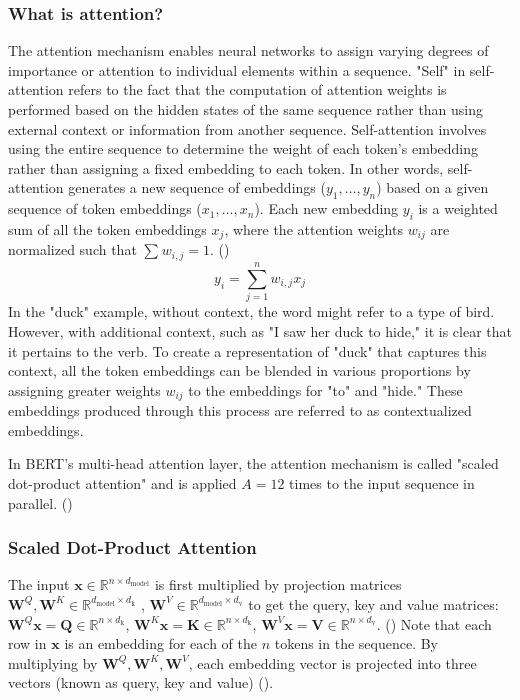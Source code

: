 \subsubsection{What is attention?}
The attention mechanism enables neural networks to assign varying degrees of importance or attention to individual elements within a sequence. "Self" in self-attention refers to the fact that the computation of attention weights is performed based on the hidden states of the same sequence rather than using external context or information from another sequence. 
Self-attention involves using the entire sequence to determine the weight of each token's embedding rather than assigning a fixed embedding to each token. In other words, self-attention generates a new sequence of embeddings ($y_1, \dots, y_n$) based on a given sequence of token embeddings ($x_1, \dots, x_n$). Each new embedding $y_i$ is a weighted sum of all the token embeddings $x_j$, where the attention weights $w_{ij}$ are normalized such that $\sum_{}^{} w_{i,j} = 1$. (\cite{tunstall_natural_2022})
$$y_i = \sum_{j=1}^{n} w_{i,j} x_j$$
In the "duck" example, without context, the word might refer to a type of bird. However, with additional context, such as "I saw her duck to hide," it is clear that it pertains to the verb. To create a representation of "duck" that captures this context, all the token embeddings can be blended in various proportions by assigning greater weights $w_{ij}$ to the embeddings for "to" and "hide." These embeddings produced through this process are referred to as contextualized embeddings.

In BERT's multi-head attention layer, the attention mechanism is called "scaled dot-product attention" and is applied $A = 12$ times to the input sequence in parallel. (\cite{tunstall_natural_2022})


\subsubsection{Scaled Dot-Product Attention}

The input
$\mathbf{x} \in \mathbb{R}^
{n \times d_{\text{model}}}$
is first multiplied by projection matrices
$\mathbf{W}^Q, \mathbf{W}^K \in \mathbb{R}^
{d_{\text{model}} \times d_{\text{k}}}$
,
$\mathbf{W}^V \in \mathbb{R}^
{d_{\text{model}} \times d_{\text{v}}}$
to get the query, key and value matrices:
$ \mathbf{W}^Q \mathbf{x} = \mathbf{Q} \in \mathbb{R}^
{n \times d_{\text{k}}}$, 
$ \mathbf{W}^K  \mathbf{x} = \mathbf{K} \in \mathbb{R}^
{n \times d_{\text{k}}}$, 
$ \mathbf{W}^V \mathbf{x} = \mathbf{V} \in \mathbb{R}^
{n \times d_{\text{v}}}$. (\cite{thickstun_transformer_2020})
Note that each row in $\mathbf{x}$ is an embedding for each of the $n$ tokens in the sequence. By multiplying by $\mathbf{W}^Q, \mathbf{W}^K, \mathbf{W}^V$, each embedding vector is projected into three vectors (known as query, key and value) (\cite{tunstall_natural_2022}).

